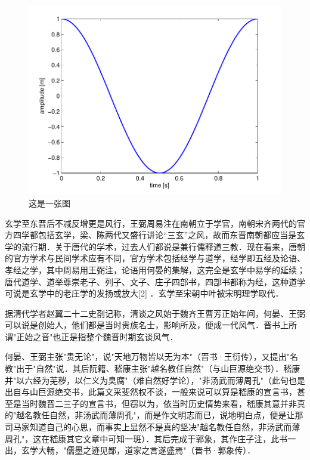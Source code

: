 \begin{figure}[ht]
	\centering
	\includegraphics[width=\linewidth]{pic/results}
	\caption{这是一张图}
	\label{fig:results}
\end{figure}

玄学至东晋后不减反增更是风行，王弼周易注在南朝立于学官，南朝宋齐两代的官方四学都包括玄学，梁、陈两代又盛行讲论“三玄”之风，故而东晋南朝都应当是玄学的流行期．关于唐代的学术，过去人们都说是兼行儒释道三教．现在看来，唐朝的官方学术与民间学术应有不同，官方学术包括经学与道学，经学即五经及论语、孝经之学，其中周易用王弼注，论语用何晏的集解，这完全是玄学中易学的延续；唐代道学、道举尊崇老子、列子、文子、庄子四部书，四部书都称为经，这种道学可说是玄学中的老庄学的发扬或放大[2]  ．玄学至宋朝中叶被宋明理学取代．

据清代学者赵翼二十二史剳记称，清谈之风始于魏齐王曹芳正始年间，何晏、王弼可以说是创始人，他们都是当时贵族名士，影响所及，便成一代风气．晋书上所谓"正始之音"也正是指整个魏晋时期玄谈风气．

何晏、王弼主张"贵无论"，说"天地万物皆以无为本"（晋书·王衍传），又提出"名教"出于"自然"说．其后阮籍、嵇康主张"越名教任自然"（与山巨源绝交书）．嵇康并"以六经为芜秽，以仁义为臭腐"（难自然好学论），"非汤武而薄周孔"（此句也是出自与山巨源绝交书，此篇文采斐然权不谈，一般来说可以算是嵇康的宣言书，甚至是当时魏晋二三子的宣言书，但窃以为，依当时历史情势来看，嵇康其意并非真的"越名教任自然，非汤武而薄周孔"，而是作文明志而已，说地明白点，便是让那司马家知道自己的心思，而事实上显然不是真的坚决"越名教任自然，非汤武而薄周孔"，这在嵇康其它文章中可知一斑）．其后完成于郭象，其作庄子注，此书一出，玄学大畅，"儒墨之迹见鄙，道家之言遂盛焉"（晋书·郭象传）．

